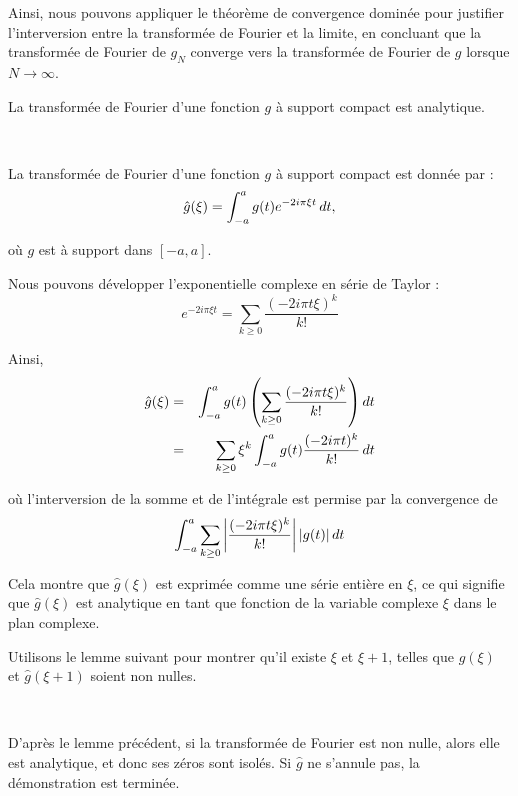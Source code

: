 Ainsi, nous pouvons appliquer le th{\'e}or{\`e}me de convergence domin{\'e}e
pour justifier l'interversion entre la transform{\'e}e de Fourier et la
limite, en concluant que la transform{\'e}e de Fourier de $g_N$ converge vers
la transform{\'e}e de Fourier de $g$ lorsque $N \to \infty$.


La transform{\'e}e de Fourier d'une fonction $g$ {\`a} support compact est
analytique.

\


La transform{\'e}e de Fourier d'une fonction $g$ {\`a} support compact est
donn{\'e}e par :
\[ \hat{g} (\xi) = \int_{- a}^a g (t) e^{- 2 i \pi \xi t}  \hspace{0.17em} dt,
\]


o{\`u} $g$ est {\`a} support dans $[- a, a]$.

Nous pouvons d{\'e}velopper l'exponentielle complexe en s{\'e}rie de Taylor :
\[ e^{- 2 i \pi \xi t} = \sum_{k \geq 0} \frac{(- 2 i \pi t \xi)^k}{k!} \]


Ainsi,
\begin{eqnarray*}
  \hat{g} (\xi) & = &  \int_{- a}^a g (t) \left( \sum_{k \geq 0} \frac{(- 2 i
  \pi t \xi)^k}{k!} \right) dt\\
  & = & \sum_{k \geq 0} \xi^k  \int_{- a}^a g (t) \frac{(- 2 i \pi t)^k}{k!} 
  \hspace{0.17em} dt
\end{eqnarray*}


o{\`u} l'interversion de la somme et de l'int{\'e}grale est permise par la
convergence de
\[ \int_{- a}^a \sum_{k \geq 0} \left| \frac{(- 2 i \pi t \xi)^k}{k!} \right|
   |g (t) | \hspace{0.17em} dt \]


Cela montre que $\hat{g} (\xi)$ est exprim{\'e}e comme une s{\'e}rie
enti{\`e}re en $\xi$, ce qui signifie que $\hat{g} (\xi)$ est analytique en
tant que fonction de la variable complexe $\xi$ dans le plan complexe.

Utilisons le lemme suivant pour montrer qu'il existe $\xi$ et $\xi + 1$,
telles que $\hat{g} (\xi)$ et $\hat{g} (\xi + 1)$ soient non nulles.

\

D'apr{\`e}s le lemme pr{\'e}c{\'e}dent, si la transform{\'e}e de Fourier est
non nulle, alors elle est analytique, et donc ses z{\'e}ros sont isol{\'e}s.
Si $\hat{g}$ ne s'annule pas, la d{\'e}monstration est termin{\'e}e.


